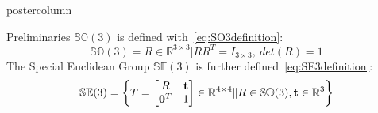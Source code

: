 \documentclass{beamer}
\begin{document}
\begin{frame}
\begin{columns}
\begin{column}{.4\textwidth}
\begin{beamercolorbox}[center]{postercolumn}
\begin{minipage}{.98\textwidth}
{\begin{myblock}{Preliminaries}
$\mathbb{SO}(3)$ is defined with~\eqref{eq:SO3definition}:
\begin{equation}
\mathbb{SO}(3)={{R} \in \mathbb{R}^{3 \times 3}|RR^T={I_{3 \times 3}},\ det({R})=1}
\label{eq:SO3definition}
\end{equation}
The Special Euclidean Group $\mathbb{SE}(3)$ is further defined~\eqref{eq:SE3definition}:
\begin{equation}
\mathbb{SE}(3)=\left\lbrace
{T}=\left[
\begin{matrix} 
{R} & \bold{t} \\
\bold{0}^T & 1
\end{matrix}
\right] \in \mathbb{R}^{4 \times 4} \| {{R} \in \mathbb{SO}(3), \bold{t}} 
 \in \mathbb{R}^3 \right\rbrace
\label{eq:SE3definition}
\end{equation}


\end{myblock}}
\end{minipage}
\end{beamercolorbox}
\end{column}
\end{columns}
\end{frame}
\end{document}
